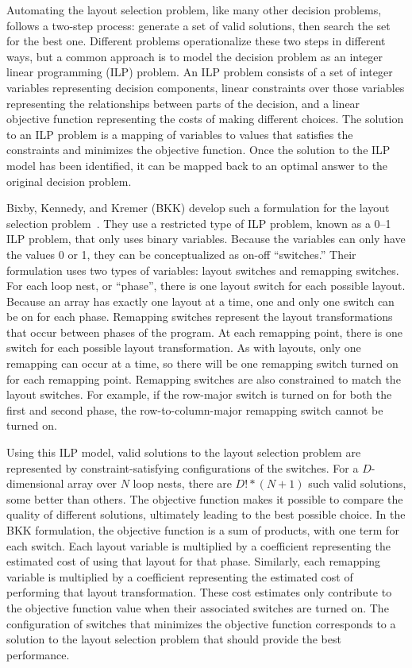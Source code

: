 Automating the layout selection problem, like many other decision problems, follows a two-step process: generate a set of valid solutions, then search the set for the best one.
Different problems operationalize these two steps in different ways, but a common approach is to model the decision problem as an integer linear programming (ILP) problem.
An ILP problem consists of a set of integer variables representing decision components, linear constraints over those variables representing the relationships between parts of the decision, and a linear objective function representing the costs of making different choices.
The solution to an ILP problem is a mapping of variables to values that satisfies the constraints and minimizes the objective function.
Once the solution to the ILP model has been identified, it can be mapped back to an optimal answer to the original decision problem.

Bixby, Kennedy, and Kremer (BKK) develop such a formulation for the layout selection problem~\cite{bixby1994automatic,kennedy1995automatic,kennedy1998automatic}.
They use a restricted type of ILP problem, known as a 0--1 ILP problem, that only uses binary variables.
Because the variables can only have the values 0 or 1, they can be conceptualized as on-off ``switches.''
Their formulation uses two types of variables: layout switches and remapping switches.
For each loop nest, or ``phase'', there is one layout switch for each possible layout.
Because an array has exactly one layout at a time, one and only one switch can be on for each phase.
Remapping switches represent the layout transformations that occur between phases of the program.
At each remapping point, there is one switch for each possible layout transformation.
As with layouts, only one remapping can occur at a time, so there will be one remapping switch turned on for each remapping point.
Remapping switches are also constrained to match the layout switches.
For example, if the row-major switch is turned on for both the first and second phase, the row-to-column-major remapping switch cannot be turned on.

Using this ILP model, valid solutions to the layout selection problem are represented by constraint-satisfying configurations of the switches.
For a $D$-dimensional array over $N$ loop nests, there are $D!*(N+1)$ such valid solutions, some better than others.
The objective function makes it possible to compare the quality of different solutions, ultimately leading to the best possible choice.
In the BKK formulation, the objective function is a sum of products, with one term for each switch.
Each layout variable is multiplied by a coefficient representing the estimated cost of using that layout for that phase.
Similarly, each remapping variable is multiplied by a coefficient representing the estimated cost of performing that layout transformation.
These cost estimates only contribute to the objective function value when their associated switches are turned on.
The configuration of switches that minimizes the objective function corresponds to a solution to the layout selection problem that should provide the best performance.

